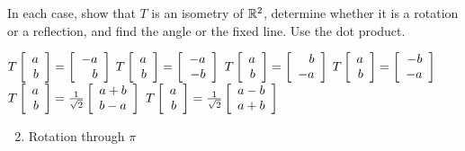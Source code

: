 \begin{multicols}{2}
\begin{ex}
In each case, show that $T$ is an isometry of $\mathbb{R}^2$, determine whether it is a rotation or a reflection, and find the angle or the fixed line. Use the dot product.
\begin{exenumerate}
\exitem $T
\left[ \begin{array}{r}
a \\
b
\end{array} \right]
=
\left[ \begin{array}{r}
-a \\
b
\end{array} \right]$
\exitem $T
\left[ \begin{array}{r}
a \\
b
\end{array} \right]
=
\left[ \begin{array}{r}
-a \\
-b
\end{array} \right]$
\exitem $T
\left[ \begin{array}{r}
a \\
b
\end{array} \right]
=
\left[ \begin{array}{r}
b \\
-a
\end{array} \right]$
\exitem $T
\left[ \begin{array}{r}
a \\
b
\end{array} \right]
=
\left[ \begin{array}{r}
-b \\
-a
\end{array} \right]$
\exitem* $T
\left[ \begin{array}{r}
a \\
b
\end{array} \right]
= \tfrac{1}{\sqrt{2}}
\left[ \begin{array}{r}
a + b \\
b - a
\end{array} \right]$
\exitem* $T
\left[ \begin{array}{r}
a \\
b
\end{array} \right]
= \tfrac{1}{\sqrt{2}}
\left[ \begin{array}{r}
a - b \\
a + b 
\end{array} \right]$
\end{exenumerate}
\begin{sol}
\begin{enumerate}[label={\alph*.}]
\setcounter{enumi}{1}
\item  Rotation through $\pi$


\end{enumerate}
\end{sol}
\end{ex}
\end{multicols}
